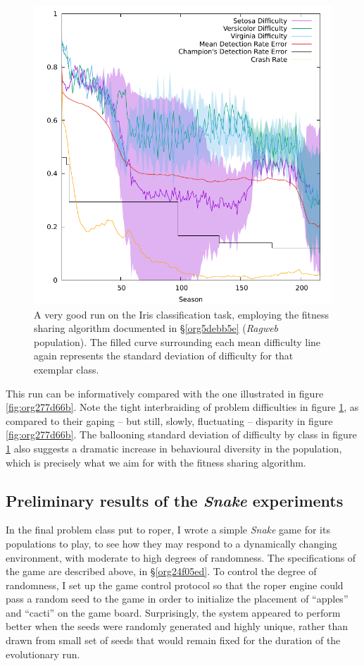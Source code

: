 \documentclass[12pt,glossary]{dalthesis}
\begin{document}
\begin{figure}[htbp]
\centering
\includegraphics[width=.9\linewidth]{../images/plots/sharing.pdf}
\caption{\label{fig:orgcfe5800}
A very good run on the Iris classification task, employing the fitness sharing algorithm documented in \S \ref{org5debb5e} (\emph{Ragweb} population). The filled curve surrounding each mean difficulty line again represents the standard deviation of difficulty for that exemplar class.}
\end{figure}



This run can be informatively compared with the one illustrated in figure
\ref{fig:org277d66b}. Note the tight interbraiding of problem difficulties in
figure \ref{fig:orgcfe5800}, as compared to their gaping -- but still, slowly,
fluctuating -- disparity in figure \ref{fig:org277d66b}. The ballooning standard
deviation of difficulty by class in figure \ref{fig:orgcfe5800} also suggests
a dramatic increase in behavioural diversity in the population, which is
precisely what we aim for with the fitness sharing algorithm.


\subsection{Preliminary results of the \emph{Snake} experiments}
\label{sec:org75d95b6}
\label{org7796b2f}

In the final problem class put to \gls{roper}, I wrote a simple \emph{Snake} game
\cite{snakefight} for its populations to play, to see how they may respond to a
dynamically changing environment, with moderate to high degrees of randomness.
The specifications of the game are described above, in \S \ref{org24f05ed}.
To control the degree of randomness, I set up the game control protocol so that
the \gls{roper} engine could pass a random seed to the game in order to initialize
the placement of ``apples'' and ``cacti'' on the game board. Surprisingly, the 
system appeared to perform better when the seeds were randomly generated and
highly unique, rather than drawn from small set of seeds that would remain fixed
for the duration of the evolutionary run. 
\end{document}
